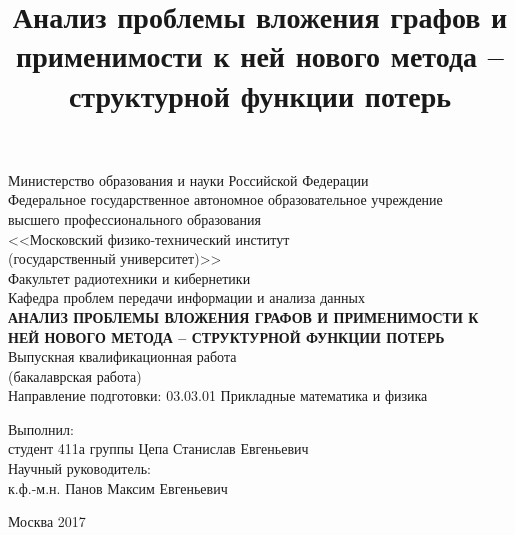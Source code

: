 \documentclass[12pt,a4paper]{extarticle}
\title{Анализ проблемы вложения графов и применимости к ней нового метода -- структурной функции потерь}
\begin{document}
    \begin{titlepage}
        \clearpage
        \pagestyle{empty}

        \begin{center}
            \textrm{Министерство образования и науки Российской Федерации}
            \\[5mm]
            Федеральное государственное автономное образовательное учреждение\\
            высшего профессионального образования\\
            <<Московский физико-технический институт\\
            {(государственный университет)}>>\\[5mm]
            Факультет радиотехники и кибернетики\\[5mm]
            Кафедра проблем передачи информации и анализа данных\\[50mm]
            \textbf{АНАЛИЗ ПРОБЛЕМЫ ВЛОЖЕНИЯ ГРАФОВ И ПРИМЕНИМОСТИ К НЕЙ НОВОГО МЕТОДА -- СТРУКТУРНОЙ ФУНКЦИИ ПОТЕРЬ}
            \\[8mm]
            \textrm{Выпускная квалификационная работа}
            \\
            (бакалаврская работа)\\[7mm]

            Направление подготовки: 03.03.01 Прикладные математика и физика\\[40mm]
        \end{center}

        \noindent Выполнил:\\
        студент 411а группы \hspace{0.9cm} \underline{\hspace{4cm}} Цепа Станислав Евгеньевич\\[2mm]

        \noindent Научный руководитель:\\
        к.ф.-м.н. \hspace{3.1cm} \underline{\hspace{4cm}} Панов Максим Евгеньевич
        \\[20mm]

        \begin{center}
            Москва 2017
        \end{center}

    \end{titlepage}

    \setcounter{page}{2}
\end{document}
